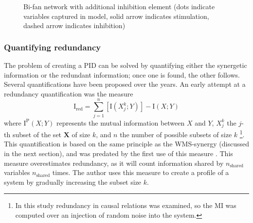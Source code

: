 \documentclass[../main.tex]{subfiles}
\begin{document}
\begin{figure}[ht]
\begin{center}
\end{center}
\caption{Bi-fan network with additional inhibition element (dots indicate variables captured in model, solid arrow indicates stimulation, dashed arrow indicates inhibition)}
\label{bifan_syn}
\end{figure}

\subsubsection{Quantifying redundancy}

The problem of creating a PID can be solved by quantifying either the synergetic information or the redundant information; once one is found, the other follows.
Several quantifications have been proposed over the years.
An early attempt at a redundancy quantification was the measure
%
\begin{equation}
\mathrm{I}_\mathrm{red} = \sum_{j=1}^n [\mathrm{I}\left( X_j^k;Y \right) ] - \mathrm{I} \left( X;Y \right)
\end{equation}
%
where $\mathrm{I}^\mathrm{P}(X;Y)$ represents the mutual information between $X$ and $Y$, $X_j^k$ the $j$-th subset of the set $\mathbf{X}$ of size $k$, and $n$ the number of possible subsets of size $k$ \cite{tononi1999measures}\footnote{In this study redundancy in causal relations was examined, so the MI was computed over an injection of random noise into the system.}.
This quantification is based on the same principle as the WMS-synergy (discussed in the next section), and was predated by the first use of this measure \cite{gawne1993independent}.
This measure overestimates redundancy, as it will count information shared by $n_\mathrm{shared}$ variables $n_\mathrm{shared}$ times.
The author uses this measure to create a profile of a system by gradually increasing the subset size $k$.
\end{document}

